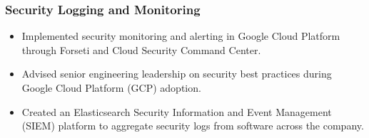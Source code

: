 \documentclass[letterpaper]{article}
\begin{document}
\subsubsection*{Security Logging and Monitoring}
\begin{itemize}[noitemsep]
	\item Implemented security monitoring and alerting in Google Cloud Platform through Forseti and Cloud Security Command Center.
	\item Advised senior engineering leadership on security best practices during Google Cloud Platform (GCP) adoption.
	\item Created an Elasticsearch Security Information and Event Management (SIEM) platform to aggregate security logs from software across the company.
\end{itemize}
\end{document}
